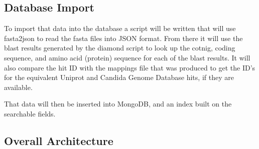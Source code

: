 \subsection{Database Import}
To import that data into the database a script will be written that will use fasta2json\cite{fasta2json} to read the fasta files into JSON format. From there it will use the blast results generated by the diamond script to look up the cotnig, coding sequence, and amino acid (protein) sequence for each of the blast results. It will also compare the hit ID with the mappings file that was produced to get the ID's for the equivalent Uniprot and Candida Genome Database hits, if they are available. 

That data will then be inserted into MongoDB, and an index built on the searchable fields. 
    



 


\subsection{Overall Architecture}

